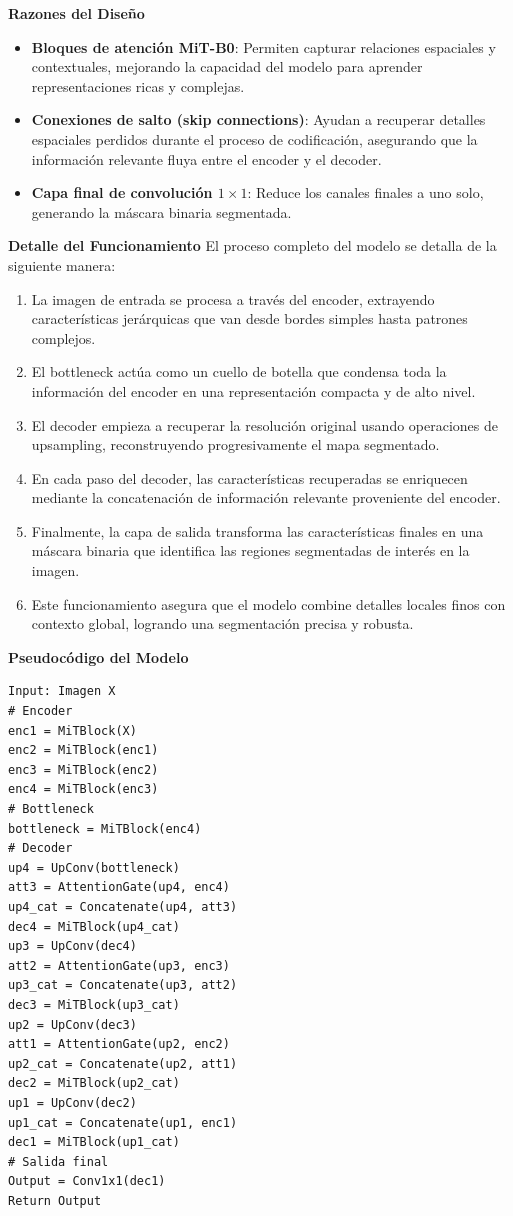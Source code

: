 \begin{enumerate}
\begin{itemize}
\textbf{Razones del Diseño}
\begin{itemize}
    \item \textbf{Bloques de atención MiT-B0}: 
    Permiten capturar relaciones espaciales y contextuales, mejorando la capacidad del modelo para aprender representaciones ricas y complejas.
    
    \item \textbf{Conexiones de salto (skip connections)}: 
    Ayudan a recuperar detalles espaciales perdidos durante el proceso de codificación, asegurando que la información relevante fluya entre el encoder y el decoder.
    
    \item \textbf{Capa final de convolución $1\times1$}: 
    Reduce los canales finales a uno solo, generando la máscara binaria segmentada.
    \end{itemize}
\textbf{Detalle del Funcionamiento}
El proceso completo del modelo se detalla de la siguiente manera:
\begin{enumerate}
    \item La imagen de entrada se procesa a través del encoder, extrayendo características jerárquicas que van desde bordes simples hasta patrones complejos.
    \item El bottleneck actúa como un cuello de botella que condensa toda la información del encoder en una representación compacta y de alto nivel.
    \item El decoder empieza a recuperar la resolución original usando operaciones de upsampling, reconstruyendo progresivamente el mapa segmentado.
    \item En cada paso del decoder, las características recuperadas se enriquecen mediante la concatenación de información relevante proveniente del encoder.
    \item Finalmente, la capa de salida transforma las características finales en una máscara binaria que identifica las regiones segmentadas de interés en la imagen.
    \item Este funcionamiento asegura que el modelo combine detalles locales finos con contexto global, logrando una segmentación precisa y robusta.
\end{enumerate}
\textbf{Pseudocódigo del Modelo}
\begin{verbatim}
Input: Imagen X
# Encoder
enc1 = MiTBlock(X)
enc2 = MiTBlock(enc1)
enc3 = MiTBlock(enc2)
enc4 = MiTBlock(enc3)
# Bottleneck
bottleneck = MiTBlock(enc4)
# Decoder
up4 = UpConv(bottleneck)
att3 = AttentionGate(up4, enc4)
up4_cat = Concatenate(up4, att3)
dec4 = MiTBlock(up4_cat)
up3 = UpConv(dec4)
att2 = AttentionGate(up3, enc3)
up3_cat = Concatenate(up3, att2)
dec3 = MiTBlock(up3_cat)
up2 = UpConv(dec3)
att1 = AttentionGate(up2, enc2)
up2_cat = Concatenate(up2, att1)
dec2 = MiTBlock(up2_cat)
up1 = UpConv(dec2)
up1_cat = Concatenate(up1, enc1)
dec1 = MiTBlock(up1_cat)
# Salida final
Output = Conv1x1(dec1)
Return Output
\end{verbatim}


\end{itemize}
\end{enumerate}

